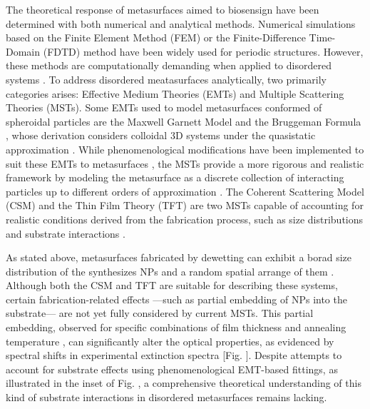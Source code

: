 The theoretical response of metasurfaces aimed to biosensign have been determined with both numerical and analytical methods. Numerical simulations based on the Finite Element Method (FEM) \cite{feuz_improving_2010,borah_plasmon_2022} or the Finite-Difference Time-Domain (FDTD) method \cite{qiu_differential_2015} have been widely used for periodic structures. However, these methods are computationally demanding when applied to disordered systems \cite{tyson_new_2020,qiu_differential_2015}. To address disordered meatasurfaces analytically, two primarily categories arises: Effective Medium Theories (EMTs) and 
Multiple Scattering Theories (MSTs). Some EMTs used to model metasurfaces conformed of  spheroidal particles are the Maxwell Garnett Model \cite{reyes2018analytical} and the Bruggeman Formula \cite{bedeaux_optical_2004}, whose derivation considers colloidal 3D systems under the quasistatic approximation \cite{sihvola_electromagnetic_2008}. While phenomenological modifications have been implemented to suit these EMTs to metasurfaces \cite{kabashin_plasmonic_2009}, the MSTs provide a more rigorous and realistic framework by modeling the metasurface as a discrete collection of interacting particles up to different orders of approximation \cite{loiko_monolayers_1998}.  The Coherent Scattering Model (CSM) \cite{reyes2018analytical} and the Thin Film Theory (TFT) \cite{bedeaux_optical_2004} are two MSTs capable of accounting for realistic conditions derived from the fabrication process, such as size distributions and substrate interactions \cite{vazquez-estrada_optical_2014,bedeaux_optical_2004}.

As stated above, metasurfaces fabricated by dewetting can exhibit a borad size distribution of the synthesizes NPs and a random spatial arrange of them \cite{hammad_improving_2023,wang_formation_2011}. Although both the CSM and TFT are suitable for describing these systems, certain fabrication-related effects ---such as partial embedding of NPs into the substrate--- are not yet fully considered by current MSTs. This partial embedding, observed for specific combinations of film thickness and annealing temperature \cite{moirangthem_enhanced_2012,meng_anisotropic_2015}, can significantly alter the optical properties, as evidenced by spectral shifts in experimental extinction spectra [Fig.  ]. Despite attempts to account for substrate effects using phenomenological EMT-based fittings, as illustrated in the inset of Fig.  , a comprehensive theoretical understanding of this kind of substrate interactions in disordered metasurfaces remains lacking.

